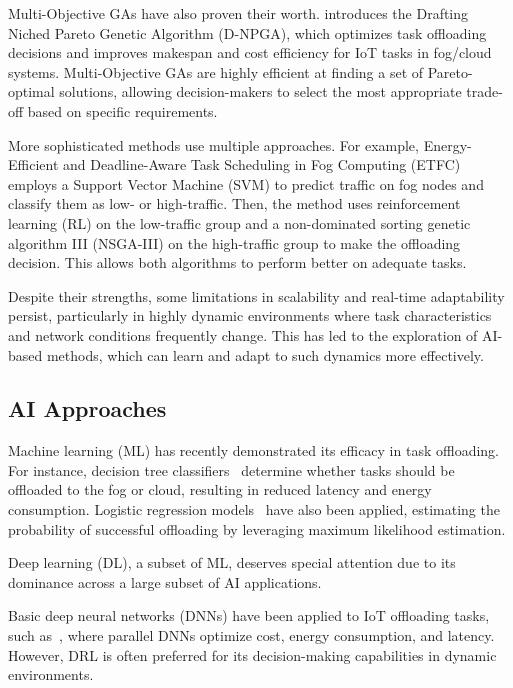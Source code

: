 \documentclass[preprint,3p,authoryear]{elsarticle}
\begin{document}
Multi-Objective GAs have also proven their worth. \citep{bernard_d-npga_2024} introduces the Drafting Niched Pareto Genetic Algorithm (D-NPGA), which optimizes task offloading decisions and improves makespan and cost efficiency for IoT tasks in fog/cloud systems. Multi-Objective GAs are highly efficient at finding a set of Pareto-optimal solutions, allowing decision-makers to select the most appropriate trade-off based on specific requirements.

More sophisticated methods use multiple approaches. For example, Energy-Efficient and Deadline-Aware Task Scheduling in Fog Computing (ETFC)~\cite{pakmehr_etfc_2024} employs a Support Vector Machine (SVM) to predict traffic on fog nodes and classify them as low- or high-traffic. Then, the method uses reinforcement learning (RL) on the low-traffic group and a non-dominated sorting genetic algorithm III (NSGA-III) on the high-traffic group to make the offloading decision. This allows both algorithms to perform better on adequate tasks.

Despite their strengths, some limitations in scalability and real-time adaptability persist, particularly in highly dynamic environments where task characteristics and network conditions frequently change. This has led to the exploration of AI-based methods, which can learn and adapt to such dynamics more effectively.



\subsection{AI Approaches}

Machine learning (ML) has recently demonstrated its efficacy in task offloading. For instance, decision tree classifiers~\citep{suryadevara_energy_2021} determine whether tasks should be offloaded to the fog or cloud, resulting in reduced latency and energy consumption. Logistic regression models~\citep{bukhari_intelligent_2022} have also been applied, estimating the probability of successful offloading by leveraging maximum likelihood estimation.

Deep learning (DL), a subset of ML, deserves special attention due to its dominance across a large subset of AI applications. 

Basic deep neural networks (DNNs) have been applied to IoT offloading tasks, such as~\citet{sarkar_deep_2022}, where parallel DNNs optimize cost, energy consumption, and latency. However, DRL is often preferred for its decision-making capabilities in dynamic environments.
\end{document}
